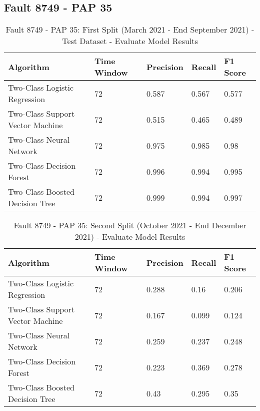 \subsection{Fault 8749 - PAP 35}

\begin{table}[!ht]
    \centering
    \begin{tabular}{|l|l|l|l|l|}
    \hline
        Algorithm & Time Window & Precision & Recall & F1 Score \\ \hline
        Two-Class Logistic Regression & 72 & 0.587 & 0.567 & 0.577 \\ \hline
        Two-Class Support Vector Machine & 72 & 0.515 & 0.465 & 0.489 \\ \hline
        Two-Class Neural Network & 72 & 0.975 & 0.985 & 0.98 \\ \hline
        Two-Class Decision Forest & 72 & 0.996 & 0.994 & 0.995 \\ \hline
        Two-Class Boosted Decision Tree & 72 & 0.999 & 0.994 & 0.997 \\ \hline
    \end{tabular}
    \caption{Fault 8749 - PAP 35: First Split (March 2021 - End September 2021) - Test Dataset - Evaluate Model Results}
    \label{9112_SCA34_1st}
\end{table}

\begin{table}[!ht]
    \centering
    \begin{tabular}{|l|l|l|l|l|}
    \hline
        Algorithm & Time Window & Precision & Recall & F1 Score \\ \hline
        Two-Class Logistic Regression & 72 & 0.288 & 0.16 & 0.206 \\ \hline
        Two-Class Support Vector Machine & 72 & 0.167 & 0.099 & 0.124 \\ \hline
        Two-Class Neural Network & 72 & 0.259 & 0.237 & 0.248 \\ \hline
        Two-Class Decision Forest & 72 & 0.223 & 0.369 & 0.278 \\ \hline
        Two-Class Boosted Decision Tree & 72 & 0.43 & 0.295 & 0.35 \\ \hline
    \end{tabular}
    \caption{Fault 8749 - PAP 35: Second Split (October 2021 - End December 2021) - Evaluate Model Results}
    \label{9112_SCA34_1st}
\end{table}

